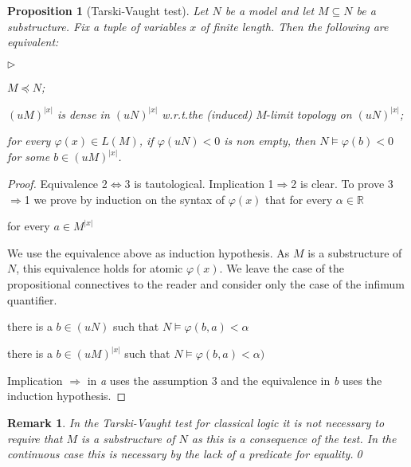 \documentclass[12pt,letterpaper,oneside,reqno]{amsart}
\newcommand{\mylabel}[1]{{#1}\hfill}
\renewenvironment{itemize}
  {\begin{list}{$\triangleright$}{%
   \setlength{\parskip}{0mm}
   \setlength{\topsep}{.2\baselineskip}
   \setlength{\rightmargin}{0mm}
   \setlength{\listparindent}{0mm}
   \setlength{\itemindent}{0mm}
   \setlength{\labelwidth}{3ex}
   \setlength{\itemsep}{.2\baselineskip}
   \setlength{\parsep}{.2\baselineskip}
   \setlength{\partopsep}{0mm}
   \setlength{\labelsep}{1ex}
   \setlength{\leftmargin}{\labelwidth+\labelsep}
   \let\makelabel\mylabel}}{%
   \end{list}}
\theoremstyle{plain}
\newtheorem{proposition}[theorem]{Proposition}
\newtheorem{remark}[theorem]{Remark}
\theoremstyle{remark}
\begin{document}
\begin{proposition}[Tarski-Vaught test]\label{prop_Tarski-Vaught} Let $N$ be a model and let $M\subseteq N$ be a substructure. 
Fix a tuple of variables $x$ of finite length.
Then the following are equivalent:
\begin{itemize}
\item[1.] $M\preceq N$;
\item[2.] $(uM)^{|x|}$ is dense in $(uN)^{|x|}$ w.r.t.\@ the (induced) $M\mbox{-}$limit topology on $(uN)^{|x|}$;
\item[3.] for every $\varphi(x)\in L(M)$, if $\varphi(uN)<0$ is non empty, then $N\models\varphi(b)<0$ for some $b\in(uM)^{|x|}$.
\end{itemize}
\end{proposition}
\begin{proof}
  Equivalence 2$\Leftrightarrow$3 is tautological.
  Implication 1$\Rightarrow$2 is clear.
  To prove 3$\Rightarrow$1 we prove by induction on the syntax of $\varphi(x)$ that for every $\alpha\in{\mathds R}$

   \hfill for every $a\in M^{|x|}$
  
  We use the equivalence above as induction hypothesis.
  As $M$ is a substructure of $N$, this equivalence holds for atomic $\varphi(x)$.
  We leave the case of the propositional connectives to the reader and consider only the case of the infimum quantifier.

   there is a $b\in(uN)$ such that $N\models\varphi(b,a)<\alpha$

   there is a $b\in(uM)^{|x|}$ such that $N\models\varphi(b,a)<\alpha)$


Implication $\Rightarrow$ in \textit{a} uses the assumption 3 and the equivalence in \textit{b} uses the induction hypothesis.
\end{proof}

\begin{remark}
In the Tarski-Vaught test for classical logic it is not necessary to require that $M$ is a substructure of $N$ as this is a consequence of the test.
In the continuous case this is necessary by the lack of a predicate for equality.\qed
\end{remark}
\end{document}
